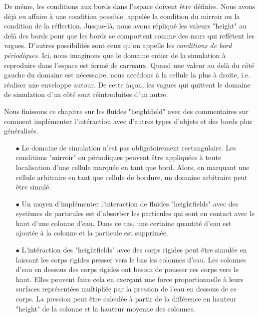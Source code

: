 \documentclass[11pt]{report}
\begin{document}
De même, les conditions aux bords dans l'espace doivent être définies. Nous avons déjà eu affaire à une condition possible, appelée la condition du mirroir ou  la condition de la réflection. Jusque-là, nous avons répliqué les valeurs "height" au delà des bords   pour que les bords se comportent comme des murs qui reflètent les vagues. D'autres possibilités sont ceux qu'on appelle les \textit{conditions de bord périodiques}. Ici, nous imaginons que le domaine entier de la simulation à reproduire dans l'espace est formé de carreaux. Quand une valeur au delà du côté gauche du domaine est nécessaire, nous accédons à la cellule la plus à droite, i.e. réaliser une enveloppe autour. De cette façon, les vagues qui quittent le domaine de simulation d'un côté sont réintroduites d'un autre.\newline

Nous finissons ce chapitre sur les fluides "heightfield" avec des commentaires sur comment implémenter l'intéraction avec d'autres types d'objets et des bords plus généralisés.\newline

\begin{itemize}

	\item[$\bullet$] Le domaine de simulation n'est pas obligatoirement rectangulaire. Les conditions "mirroir" ou périodiques peuvent être appliquées à toute localisation d'une cellule marquée en tant que bord. Alors, en marquant une cellule arbitraire en tant que cellule de bordure, un domaine arbitraire peut être simulé.\\

	\item[$\bullet$] Un moyen d'implémenter l'interaction de fluides "heightfields" avec des systèmes de particules est d'absorber les particules qui sont en contact avec le haut d'une colonne d'eau. Dans ce cas, une certaine quantité d'eau est ajoutée à la colonne et la particule est supprimée. \cite{Obrien-95}\\
	
	\item[$\bullet$]L'intéraction des "heightfields" avec des corps rigides peut être simulée en laissant les corps rigides presser vers le bas les colonnes d'eau. Les colonnes d'eau en dessous des corps rigides ont besoin de pousser ces corps vers le haut. Elles peuvent faire cela en exerçant une force proportionnelle  à leurs surfaces représentées multipliée par la pression de l'eau en dessous de ce corps. La pression peut être calculée à partir de la différence en hauteur "height" de la colonne et la hauteur moyenne des colonnes.	
	
\end{itemize}
\end{document}
